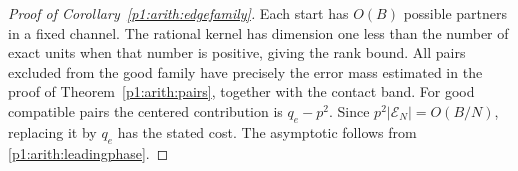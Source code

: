 \begin{proof}[Proof of Corollary~\ref{p1:arith:edgefamily}]
Each start has $O(B)$ possible partners in a fixed channel.  The rational
kernel has dimension one less than the number of exact units when that
number is positive, giving the rank bound.  All pairs excluded from the good
family have precisely the error mass estimated in the proof of
Theorem~\ref{p1:arith:pairs}, together with the contact band.
For good compatible pairs the centered contribution is $q_e-p^2$.
Since $p^2|\mathcal E_N|=O(B/N)$, replacing it by $q_e$ has the stated cost.
The asymptotic follows from \eqref{p1:arith:leadingphase}.
\end{proof}

